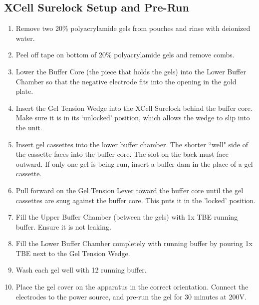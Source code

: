 \documentclass{ssiBio}
\begin{document}
\subsection{XCell Surelock Setup and Pre-Run}
\begin{enumerate}
\item{Remove two 20\% polyacrylamide gels from pouches and rinse with deionized water.}
\item{Peel off tape on bottom of 20\% polyacrylamide gels and remove combs.}
\item{Lower the Buffer Core (the piece that holds the gels) into the Lower Buffer Chamber so that the negative electrode fits into the opening in the gold plate.}
\item{Insert the Gel Tension Wedge into the XCell Surelock behind the buffer core. Make sure it is in its `unlocked' position, which allows the wedge to slip into the unit.}
\item{Insert gel cassettes into the lower buffer chamber. The shorter ``well" side of the cassette faces into the buffer core. The slot on the back must face outward. If only one gel is being run, insert a buffer dam in the place of a gel cassette.}
\item{Pull forward on the Gel Tension Lever toward the buffer core until the gel cassettes are snug against the buffer core. This puts it in the 'locked' position.}
\item{Fill the Upper Buffer Chamber (between the gels) with 1x TBE running buffer. Ensure it is not leaking.}
\item{Fill the Lower Buffer Chamber completely with running buffer by pouring 1x TBE next to the Gel Tension Wedge.}
\item{Wash each gel well with 12 \uL{} running buffer.}
\item{Place the gel cover on the apparatus in the correct orientation. Connect the electrodes to the power source, and pre-run the gel for 30 minutes at 200V.}
\end{enumerate}
\end{document}
